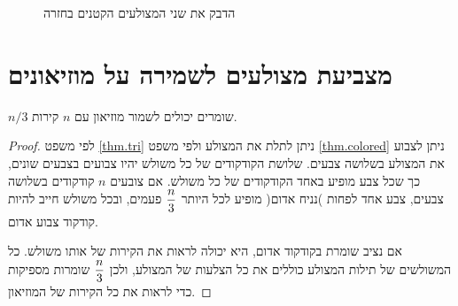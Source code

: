 \begin{figure}
\begin{center}
\end{center}
\caption{הדבק את שני המצולעים הקטנים בחזרה}\label{f.museum.three-5}
\end{figure}


\section{מצביעת מצולעים לשמירה על מוזיאונים}\label{s.museum-guard}

\begin{theorem}
$n/3$
שומרים יכולים לשמור מוזיאון עם 
$n$
קירות.
\end{theorem}


\begin{proof}
לפי משפט
\ref{thm.tri}
ניתן לתלת את המצולע ולפי משפט
\ref{thm.colored}
ניתן לצבוע את המצולע בשלושה צבעים. שלושת הקודקודים של כל משולש יהיו צבועים בצבעים שונים, כך שכל צבע מופיע באחד הקודקודים של כל משולש. אם צובעים 
$n$
קודקודים בשלושה צבעים, צבע אחד לפחות )נניח אדום( מופיע לכל היותר
$\displaystyle\frac{n}{3}$
פעמים, ובכל משולש חייב להיות קודקוד צבוע אדום.

אם נציב שומרת בקודקוד אדום, היא יכולה לראות את הקירות של אותו משולש. כל המשולשים של תילות המצולע כוללים את כל הצלעות של המצולע, ולכן
$\displaystyle\frac{n}{3}$
שומרות מספיקות כדי לראות את כל הקירות של המוזיאון.
\end{proof}


